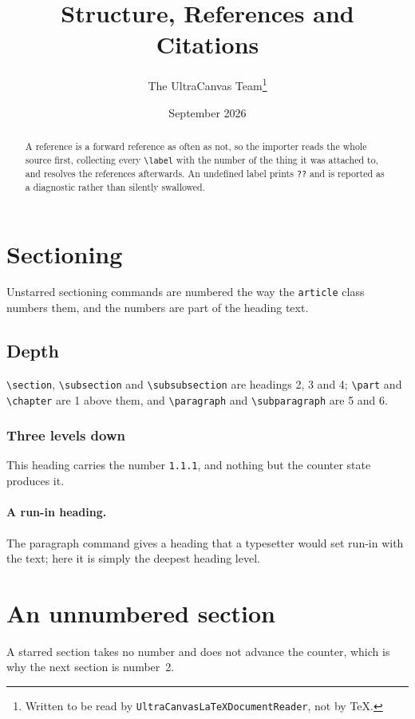 \documentclass[11pt]{article}
\title{Structure, References and Citations}
\author{The UltraCanvas Team\thanks{Written to be read by
  \texttt{UltraCanvasLaTeXDocumentReader}, not by \TeX.}}
\date{September 2026}
\begin{document}
\maketitle
\tableofcontents

\begin{abstract}
A reference is a forward reference as often as not, so the importer reads
the whole source first, collecting every \texttt{\textbackslash label} with
the number of the thing it was attached to, and resolves the references
afterwards. An undefined label prints \texttt{??} and is reported as a
diagnostic rather than silently swallowed.
\end{abstract}

\section{Sectioning}\label{sec:sectioning}
Unstarred sectioning commands are numbered the way the \texttt{article}
class numbers them, and the numbers are part of the heading text.

\subsection{Depth}\label{sec:depth}
\texttt{\textbackslash section}, \texttt{\textbackslash subsection} and
\texttt{\textbackslash subsubsection} are headings 2, 3 and 4;
\texttt{\textbackslash part} and \texttt{\textbackslash chapter} are 1 above
them, and \texttt{\textbackslash paragraph} and
\texttt{\textbackslash subparagraph} are 5 and 6.

\subsubsection{Three levels down}
This heading carries the number \texttt{1.1.1}, and nothing but the counter
state produces it.

\paragraph{A run-in heading.} The paragraph command gives a heading that a
typesetter would set run-in with the text; here it is simply the deepest
heading level.

\section*{An unnumbered section}
A starred section takes no number and does not advance the counter, which is
why the next section is number~2.
\end{document}
